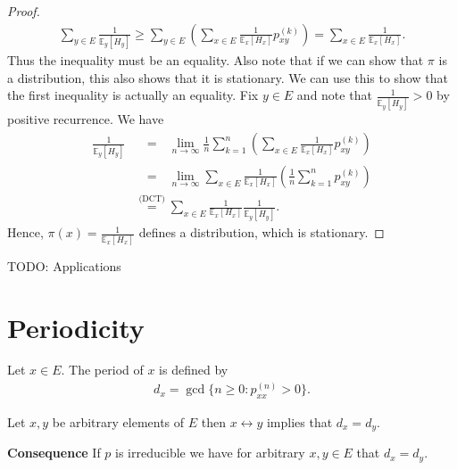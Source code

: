 \begin{proof}
\begin{align}
	\sum_{y \in E}^{} \frac{1}{\mathbb{E}_{y} \left[ H_y \right] } \geq \sum_{y \in E}^{} \left( \sum_{x \in E}^{} \frac{1}{\mathbb{E}_{x} \left[ H_x \right] } p_{xy}^{(k)} \right) = \sum_{x \in E}^{} \frac{1}{\mathbb{E}_{x} \left[ H_x \right] }
.\end{align}
Thus the inequality must be an equality. Also note that if we can show that $\pi$ is a distribution, this also shows that it is stationary. We can use this to show that the first inequality is actually an equality. Fix $y \in E$ and note that $\frac{1}{\mathbb{E}_{y} \left[ H_y \right] }>0$ by positive recurrence. We have
\begin{align}
	\frac{1}{\mathbb{E}_{y} \left[ H_y \right] } &\stackrel{\phantom{\textrm{(DCT)}}}{=} \lim_{n \to \infty } \frac{1}{n} \sum_{k=1}^{n}  \left( \sum_{x \in E}^{} \frac{1}{\mathbb{E}_{x} \left[ H_x \right] } p_{xy}^{(k)} \right) \\
						     &\stackrel{\phantom{\textrm{(DCT)}}}{=} \lim_{n \to \infty }\sum_{x \in E}^{} \frac{1}{\mathbb{E}_{x} \left[ H_x \right] } \left( \frac{1}{n} \sum_{k=1}^{n} p_{xy}^{(k)} \right) \\
						     &\stackrel{\textrm{(DCT)}}{=} \sum_{x \in E}^{} \frac{1}{\mathbb{E}_{x} \left[ H_x \right] } \frac{1}{\mathbb{E}_{y} \left[ H_y \right] }
.\end{align}
Hence, $\pi(x) = \frac{1}{\mathbb{E}_{x} \left[ H_x \right] } $ defines a distribution, which is stationary.
\end{proof}

TODO: Applications

\section{Periodicity}
\begin{defn}
	Let $x \in E$. The period of $x$ is defined by
	\begin{align}
	\boxed{d_x = \gcd\{n\geq 0: p_{xx}^{(n)}>0\} }
	.\end{align}
	
\end{defn}

\begin{prop}[]
	Let $x,y$ be arbitrary elements of $ E$ then $ x \leftrightarrow y$ implies that $d_x=d_y$.
\end{prop}

\textbf{Consequence} If $p$ is irreducible we have for arbitrary $x,y \in E$ that $d_x = d_y$.

